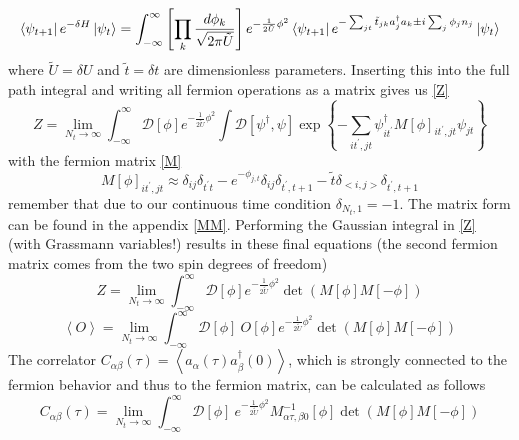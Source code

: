 \begin{equation}\label{x}
\bra{\psi_{t+1}}e^{-\delta H} \ket{\psi_{t}}=\int_{-\infty}^{\infty}\left[\prod_{k} \frac{d \phi_{k}}{\sqrt{2 \pi\tilde{U}}}\right] e^{-\frac{1}{2 \tilde{U}} \phi^2}\bra{\psi_{t+1}}e^{-\sum_{j t} \tilde{t}_{j k} a_{j}^{\dagger} a_{k} \pm i \sum_{j} \phi_{j} n_{j}} \ket{\psi_{t}}
\end{equation}
where $\tilde{U}=\delta U$ and $\tilde{t}=\delta t$ are dimensionless parameters. 
Inserting this into the full path integral and writing all fermion operations as a matrix gives us \eqref{Z}
\begin{equation}\label{Z}
Z=\lim _{N_{t} \rightarrow \infty} \int_{-\infty}^{\infty} \mathcal{D}[\phi]e^{-\frac{1}{2 \tilde{U}} \phi^2}\int \mathcal{D}\left[\psi^{\dagger}, \psi\right] \exp \left\{-\sum_{i t^{\prime}, j t} \psi_{i t^{\prime}}^{\dagger} M[\phi]_{i t^{\prime}, j t} \psi_{j t}\right\}
\end{equation}
with the fermion matrix \eqref{M}
\begin{equation}\label{M}
M[\phi]_{i t^{\prime}, j t} \approx \delta_{i j} \delta_{t^{\prime} t}-e^{- \phi_{j, t}} \delta_{i j} \delta_{t^{\prime}, t+1}-\tilde{t} \delta_{< i,j>}\delta_{t^{\prime}, t+1}
\end{equation}
remember that due to our continuous time condition $\delta_{N_t,1}=-1$. The matrix form can be found in the appendix \ref{MM}. 
Performing the Gaussian integral in \eqref{Z} (with Grassmann variables!) results in these final equations (the second fermion matrix comes from the two spin degrees of freedom)
\begin{equation}\label{Zf}
Z=\lim _{N_{t} \rightarrow \infty} \int_{-\infty}^{\infty} \mathcal{D}[\phi]e^{-\frac{1}{2 \tilde{U}} \phi^2}\det(M[\phi]M[-\phi])
\end{equation}
\begin{equation}\label{Of}
\left\langle O\right\rangle =\lim _{N_{t} \rightarrow \infty} \int_{-\infty}^{\infty} \mathcal{D}[\phi]\:O[\phi]e^{-\frac{1}{2 \tilde{U}} \phi^2}\det(M[\phi]M[-\phi])
\end{equation}
The correlator $C_{\alpha\beta}(\tau) = \left\langle a_\alpha(\tau)a_\beta^\dagger(0)\right\rangle $, which is strongly connected to the fermion behavior and thus to the fermion matrix, can be calculated as follows
\begin{equation}\label{C}
C_{\alpha\beta}(\tau) =\lim _{N_{t} \rightarrow \infty} \int_{-\infty}^{\infty} \mathcal{D}[\phi]\:e^{-\frac{1}{2 \tilde{U}} \phi^2}M^{-1}_{\alpha\tau,\beta 0}[\phi]\det(M[\phi]M[-\phi])
\end{equation}

